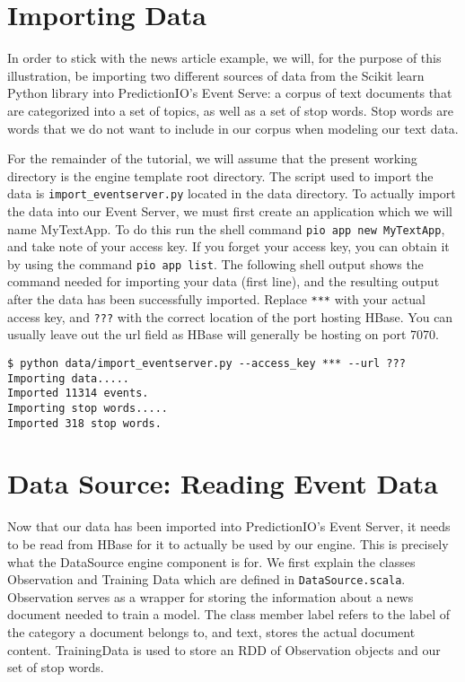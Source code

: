 \documentclass[a4paper,12pt]{article}
\renewcommand{\tt}[1]{\texttt{#1}}
\newcommand{\3}{\left}
\newcommand{\4}{\right}
\renewcommand{\-}[1]{{}^{-#1}}
\begin{document}
\section*{Importing Data}

In order to stick with the news article example, we will, for the purpose of this illustration, be importing two different sources of data from the Scikit learn Python library into PredictionIO's Event Serve: a corpus of text documents that are categorized into a set of topics, as well as a set of stop words. Stop words are words that we do not want to include in our corpus when modeling our text data. 

For the remainder of the tutorial, we will assume that the present working directory is the engine template root directory. The script used to import the data is \tt{import\_eventserver.py} located in the data directory. To actually import the data into our Event Server, we must first create an application which we will name MyTextApp. To do this run the shell command \tt{pio app new MyTextApp}, and take note of your access key. If you forget your access key, you can obtain it by using the command \tt{pio app list}. The following shell output shows the command needed for importing your data (first line), and the resulting output after the data has been successfully imported. Replace \tt{***} with your actual access key, and \tt{???} with the correct location of the port hosting HBase. You can usually leave out the url field as HBase will generally be hosting on port 7070.

\begin{verbatim}
$ python data/import_eventserver.py --access_key *** --url ???
Importing data.....
Imported 11314 events.
Importing stop words.....
Imported 318 stop words.
 \end{verbatim}

\section*{Data Source: Reading Event Data}

Now that our data has been imported into PredictionIO's Event Server, it needs to be read from HBase for it to actually be used by our engine. This is precisely what the DataSource engine component is for. We first explain the classes Observation and Training Data which are defined in \tt{DataSource.scala}. Observation serves as a wrapper for storing the information about a news document needed to train a model. The class member label refers to the label of the category a document belongs to, and text, stores the actual document content. TrainingData is used to store an RDD of Observation objects and our set of stop words. 
\end{document}
